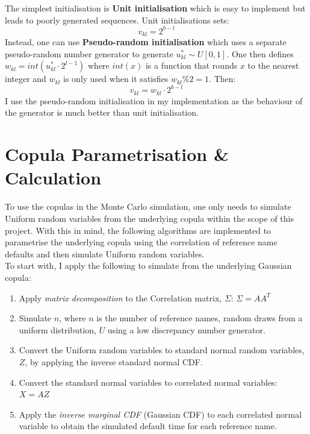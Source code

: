 \documentclass{report}
\theoremstyle{plain}
\theoremstyle{definition}
\begin{document}
The simplest initialisation is \textbf{Unit initialisation} which is easy to implement but leads to poorly generated sequences. Unit initialisations sets: $$v_{kl} = 2^{b-l}$$
Instead, one can use \textbf{Pseudo-random initialisation} which uses a separate pseudo-random number generator to generate $u_{kl}^* \sim U[0,1]$. One then defines $w_{kl} = int(u_{kl}^* \cdot 2^{l-1})$ where $int(x)$ is a function that rounds $x$ to the nearest integer and $w_{kl}$ is only used when it satisfies $w_{kl} \% 2 = 1$. Then: $$v_{kl} = w_{kl} \cdot 2^{b-l}$$
I use the pseudo-random initialisation in my implementation as the behaviour of the generator is much better than unit initialisation.

\section{Copula Parametrisation \& Calculation}

To use the copulas in the Monte Carlo simulation, one only needs to simulate Uniform random variables from the underlying copula within the scope of this project. With this in mind, the following algorithms are implemented to parametrise the underlying copula using the correlation of reference name defaults and then simulate Uniform random variables.\\

To start with, I apply the following to simulate from the underlying Gaussian copula:
\begin{enumerate}
	\item Apply \emph{matrix decomposition} to the Correlation matrix, $\Sigma$: $\Sigma = A A^{T}$
	\item Simulate $n$, where $n$ is the number of reference names, random draws from a uniform distribution, $U$ using a low discrepancy number generator.
	\item Convert the Uniform random variables to standard normal random variables, $Z$, by applying the inverse standard normal CDF.
	\item Convert the standard normal variables to correlated normal variables: $X = AZ$
	\item Apply the \emph{inverse marginal CDF} (Gaussian CDF) to each correlated normal variable to obtain the simulated default time for each reference name.
\end{enumerate}
\end{document}

